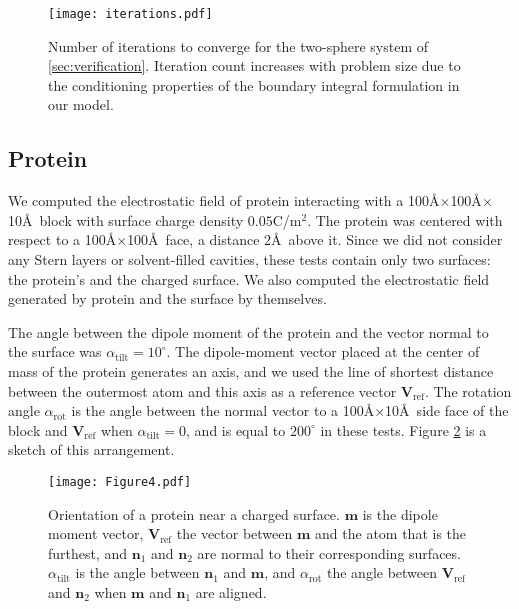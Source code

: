 \begin{figure}%
   \centering
   \texttt{[image: iterations.pdf]} 
   \caption{Number of iterations to converge for the two-sphere system of \ref{sec:verification}. Iteration count increases with problem size due to the conditioning properties of the boundary integral formulation in our model.}
   \label{fig:iterations}
\end{figure}


\subsection{Protein \gb} \label{sec:PGB}

We computed the electrostatic field of protein \gb interacting with a 100\AA$\times$100\AA$\times$10\AA\ block with surface charge density $0.05$C/m$^2$. 
The protein was centered with respect to a  100\AA$\times$100\AA\ face, a distance 2\AA\ above it. Since we did not consider any Stern layers or solvent-filled cavities, these tests contain only two surfaces: the protein's \ses and the charged surface.
We also computed the electrostatic field generated by protein \gb and the surface by themselves.

The angle between the dipole moment of the protein and the vector normal to the surface was $\alpha_\text{tilt}=10^\circ$. 
The dipole-moment vector placed at the center of mass of the protein generates an axis, and we used the line of shortest distance between the outermost atom and this axis as a reference vector $\mathbf{V}_{\text{ref}}$. 
The rotation angle $\alpha_{\text{rot}}$ is the angle between the normal vector to a 100\AA$\times$10\AA\ side face of the block and $\mathbf{V}_{\text{ref}}$ when $\alpha_\text{tilt}=0$, and is equal to $200^\circ$ in these tests. Figure \ref{fig:protein_surface} is a sketch of this arrangement.

\begin{figure}%
   \centering
   \texttt{[image: Figure4.pdf]} 
   \caption{Orientation of a protein near a charged surface. $\mathbf{m}$ is the dipole moment vector, $\mathbf{V}_\text{ref}$ the vector between $\mathbf{m}$ and the atom that is the furthest, and $\mathbf{n}_1$ and $\mathbf{n}_2$ are normal to their corresponding surfaces. $\alpha_\text{tilt}$ is the angle between $\mathbf{n}_1$ and $\mathbf{m}$, and $\alpha_\text{rot}$ the angle between $\mathbf{V}_\text{ref}$ and $\mathbf{n}_2$ when $\mathbf{m}$ and $\mathbf{n}_1$ are aligned.}
   \label{fig:protein_surface}
\end{figure}

